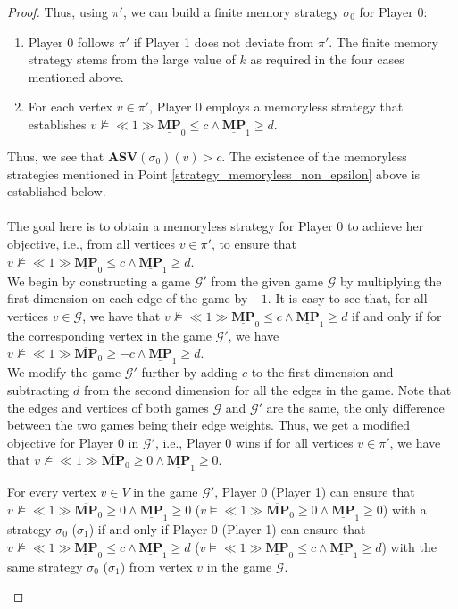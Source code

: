 \begin{proof}
Thus, using $\pi'$, we can build a finite memory strategy $\sigma_0$ for Player 0:
\begin{enumerate}
    \item Player 0 follows $\pi'$ if Player 1 does not deviate from $\pi'$. The finite memory strategy stems from the large value of $k$ as required in the four cases mentioned above.
    \item \label{strategy_memoryless_non_epsilon} For each vertex $v \in \pi'$, Player 0 employs a memoryless strategy that establishes $v \nvDash \ll 1 \gg \underline{\mathbf{MP}}_0 \leqslant c \land \underline{\mathbf{MP}}_1 \geqslant d$.
\end{enumerate}
Thus, we see that $\mathbf{ASV}(\sigma_0)(v) > c$.
The existence of the memoryless strategies mentioned in Point \ref{strategy_memoryless_non_epsilon} above is established below. \\ \\ \noindent
The goal here is to obtain a memoryless strategy for Player 0 to achieve her objective, i.e., from all vertices $v \in \pi'$, to ensure that $v \nvDash \ll 1 \gg \underline{\mathbf{MP}}_0 \leqslant c \land \underline{\mathbf{MP}}_1 \geqslant d$. \\ \noindent
We begin by constructing a game $\mathcal{G'}$ from the given game $\mathcal{G}$ by multiplying the first dimension on each edge of the game by $-1$. It is easy to see that, for all vertices $v \in \mathcal{G}$, we have that $v \nvDash \ll 1 \gg \underline{\mathbf{MP}}_0 \leqslant c \land \underline{\mathbf{MP}}_1 \geqslant d$ if and only if for the corresponding vertex in the game $\mathcal{G'}$, we have $v \nvDash \ll 1 \gg \overline{\mathbf{MP}}_0 \geqslant -c \land \underline{\mathbf{MP}}_1 \geqslant d$.\\ \noindent
We modify the game $\mathcal{G'}$ further by adding $c$ to the first dimension and subtracting $d$ from the second dimension for all the edges in the game. Note that the edges and vertices of both games $\mathcal{G}$ and $\mathcal{G'}$ are the same, the only difference between the two games being their edge weights. Thus, we get a modified objective for Player 0 in $\mathcal{G'}$, i.e., Player 0 wins if for all vertices $v \in \pi'$, we have that $v \nvDash \ll 1 \gg \overline{\mathbf{MP}}_0 \geqslant 0 \land \underline{\mathbf{MP}}_1 \geqslant 0$.

\begin{proposition}
\label{PropGameStrEqNewGameStrNonEps}
For every vertex $v \in V$ in the game $\mathcal{G'}$, Player 0 (Player 1) can ensure that $v \nvDash \ll 1 \gg \overline{\mathbf{MP}}_0 \geqslant 0 \land \underline{\mathbf{MP}}_1 \geqslant 0$ ($v \models \ll 1 \gg \overline{\mathbf{MP}}_0 \geqslant 0 \land \underline{\mathbf{MP}}_1 \geqslant 0$) with a strategy $\sigma_0$ ($\sigma_1$) if and only if Player 0 (Player 1) can ensure that $v \nvDash \ll 1 \gg \underline{\mathbf{MP}}_0 \leqslant c \land \underline{\mathbf{MP}}_1 \geqslant d$ ($v \models \ll 1 \gg \underline{\mathbf{MP}}_0 \leqslant c \land \underline{\mathbf{MP}}_1 \geqslant d$) with the same strategy $\sigma_0$ ($\sigma_1$) from vertex $v$ in the game $\mathcal{G}$.
\end{proposition}


\end{proof}
